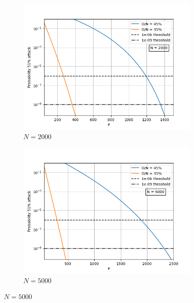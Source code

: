 \begin{figure}[H]
\centering

 \begin{subfigure}[b]{0.45\textwidth}
        \includegraphics[width=\textwidth]{Figures/Prob51_vs_P_N2000_O35_to_45}
        \renewcommand{\thesubfigure}{a}
     \caption{$N = 2000$}
        \label{fig:N2000}
    \end{subfigure}
    \begin{subfigure}[b]{0.45\textwidth}
        \includegraphics[width=\textwidth]{Figures/Prob51_vs_P_N5000_O35_to_45} 
        \renewcommand{\thesubfigure}{b}
        \caption{$N = 5000$}
        \label{fig:N5000}
    \end{subfigure}

\end{figure}
